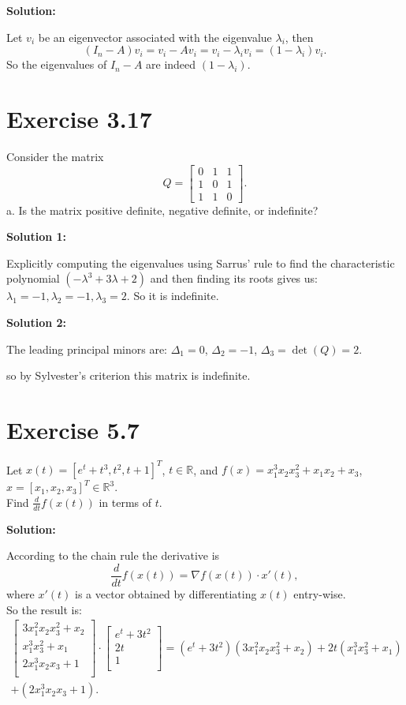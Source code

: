 \documentclass{article}
\begin{document}
\textbf{Solution:}

Let $v_i$ be an eigenvector associated with the eigenvalue $\lambda_i$, then
\[
	(I_n-A)v_i=v_i-Av_i=v_i-\lambda_iv_i=(1-\lambda_i)v_i.
\]
So the eigenvalues of $I_n-A$ are indeed $(1-\lambda_i)$.
\section*{Exercise 3.17}
Consider the matrix
\[ Q=
\begin{bmatrix}
0 & 1 & 1\\	
1 & 0 & 1\\
1 & 1 & 0
\end{bmatrix}.
\]
a. Is the matrix positive definite, negative definite, or indefinite?

\textbf{Solution 1:}

Explicitly computing the eigenvalues using Sarrus' rule to find the characteristic
polynomial $(-\lambda^3+3\lambda+2)$ and then finding its roots gives us:\\
$\lambda_1=-1,\lambda_2=-1,\lambda_3=2$. So it is indefinite.

\textbf{Solution 2:}

The leading principal minors are: $\Delta_1=0$, $\Delta_2=-1$,
$\Delta_3=\det(Q)=2$.

so by Sylvester's criterion this matrix is indefinite.
\section*{Exercise 5.7}
Let $x(t)=[e^t+t^3,t^2,t+1]^T$, $t\in \mathbb{R}$, and $f(x)=x_1^3x_2x_3^2 +
x_1x_2 + x_3$,\\
$x=[x_1,x_2,x_3]^T\in \mathbb{R}^3$.\\
Find $\frac{d}{dt}f(x(t))$ in terms of $t$.

\textbf{Solution:}

According to the chain rule the derivative is
\[
\frac{d}{dt}f(x(t))=\nabla f(x(t))\cdot x'(t),
\]
where $x'(t)$ is a vector obtained by differentiating $x(t)$ entry-wise.\\
So the result is:
\begin{multline*}
\begin{bmatrix}
	3x_1^2x_2x_3^2+x_2\\
	x_1^3x_3^2 + x_1\\
	2x_1^3x_2x_3+1\\
\end{bmatrix}
\cdot
\begin{bmatrix}
	e^t+3t^2\\
	2t\\
	1\\
\end{bmatrix}
=
(e^t+3t^2)(3x_1^2x_2x_3^2+x_2)+2t(x_1^3x_3^2+x_1) \\
+(2x_1^3x_2x_3+1).
\end{multline*}
\end{document}
